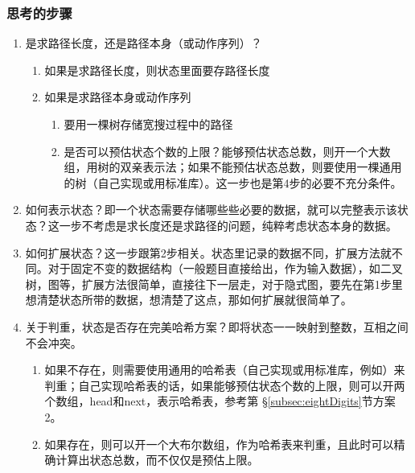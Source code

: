 \subsubsection{思考的步骤}
\begin{enumerate}
\item 是求路径长度，还是路径本身（或动作序列）？
    \begin{enumerate}
    \item 如果是求路径长度，则状态里面要存路径长度
    \item 如果是求路径本身或动作序列
        \begin{enumerate}
            \item 要用一棵树存储宽搜过程中的路径
            \item 是否可以预估状态个数的上限？能够预估状态总数，则开一个大数组，用树的双亲表示法；如果不能预估状态总数，则要使用一棵通用的树（自己实现或用标准库）。这一步也是第4步的必要不充分条件。
        \end{enumerate}
    \end{enumerate}
\item 如何表示状态？即一个状态需要存储哪些些必要的数据，就可以完整表示该状态？这一步不考虑是求长度还是求路径的问题，纯粹考虑状态本身的数据。
\item 如何扩展状态？这一步跟第2步相关。状态里记录的数据不同，扩展方法就不同。对于固定不变的数据结构（一般题目直接给出，作为输入数据），如二叉树，图等，扩展方法很简单，直接往下一层走，对于隐式图，要先在第1步里想清楚状态所带的数据，想清楚了这点，那如何扩展就很简单了。
\item 关于判重，状态是否存在完美哈希方案？即将状态一一映射到整数，互相之间不会冲突。
    \begin{enumerate}
    \item 如果不存在，则需要使用通用的哈希表（自己实现或用标准库，例如）来判重；自己实现哈希表的话，如果能够预估状态个数的上限，则可以开两个数组，head和next，表示哈希表，参考第 \S \ref{subsec:eightDigits}节方案2。
    \item 如果存在，则可以开一个大布尔数组，作为哈希表来判重，且此时可以精确计算出状态总数，而不仅仅是预估上限。
    \end{enumerate}
\end{enumerate}


